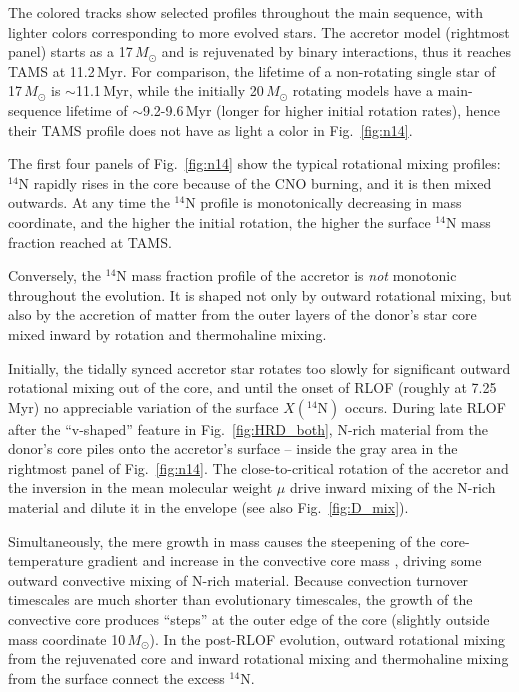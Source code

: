 \documentclass[twocolumn,twocolappendix,trackchanges]{aastex63}
\DeclareRobustCommand{\Figref}[1]{Fig.~\ref{#1}}
\begin{document}
The colored tracks show selected profiles throughout the main
sequence, with lighter colors corresponding to more evolved stars. The
accretor model (rightmost panel) starts as a 17$\,M_\odot$ and is
rejuvenated by binary interactions, thus it reaches TAMS at
11.2\,Myr. For comparison, the lifetime of a non-rotating single star
of 17\,$M_\odot$ is $\sim$11.1\,Myr, while the initially 20\,$M_\odot$
rotating models have a main-sequence lifetime of $\sim$9.2-9.6\,Myr (longer
for higher initial rotation rates), hence their TAMS profile does not
have as light a color in \Figref{fig:n14}.

The first four panels of \Figref{fig:n14} show the typical rotational
mixing profiles: $^{14}\mathrm{N}$ rapidly rises in the core because
of the CNO burning, and it is then mixed outwards. At any time
the $^{14}\mathrm{N}$ profile is monotonically decreasing in mass
coordinate, and the higher the initial rotation, the higher the
surface $^{14}\mathrm{N}$ mass fraction reached at TAMS.

Conversely, the $^{14}\mathrm{N}$ mass fraction profile of the
accretor is \emph{not} monotonic throughout the evolution. It is shaped not only by outward
rotational mixing, but also by the accretion of matter from the outer
layers of the donor's star core mixed inward by rotation and
thermohaline mixing.

Initially, the tidally synced accretor star
rotates too slowly for significant outward rotational mixing out of
the core, and until the onset of RLOF (roughly at 7.25\,Myr) no appreciable variation of the
surface $X(^{14}\mathrm{N})$ occurs. During late RLOF after the
``v-shaped'' feature in \Figref{fig:HRD_both}, N-rich material from the
donor's core piles onto the accretor's surface -- inside the gray area in
the rightmost panel of \Figref{fig:n14}. The close-to-critical
rotation of the accretor and the inversion in the mean molecular
weight $\mu$ drive inward mixing of
the N-rich material and dilute it in the envelope (see also \Figref{fig:D_mix}).

Simultaneously, the mere growth in mass causes the steepening of the
core-temperature gradient and increase in the convective core mass
\citep[rejuvenation, e.g.,][]{schneider:16}, driving some outward convective mixing
of N-rich material. Because convection turnover timescales are much
shorter than evolutionary timescales, the growth of the convective
core produces ``steps'' at the outer edge of the core (slightly
outside mass coordinate 10\,$M_\odot$). In the post-RLOF evolution,
outward rotational mixing from the rejuvenated core and inward
rotational mixing and thermohaline mixing from the surface connect the
excess $^{14}\mathrm{N}$.
\end{document}
